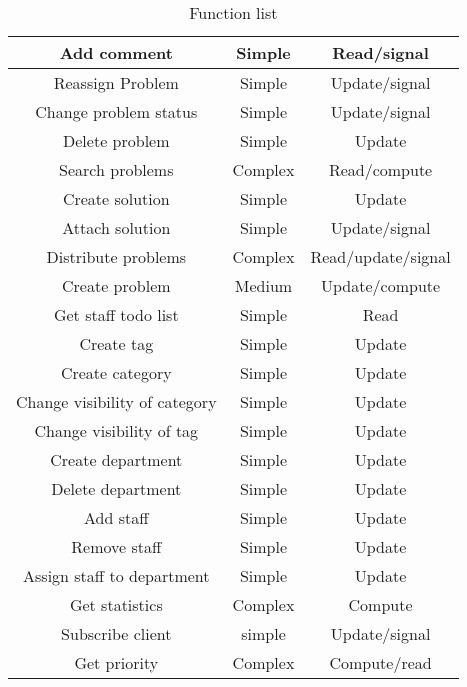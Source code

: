 \begin{table}[h]
\begin{center}
\begin{tabular}{|c|c|c|}
\hline
Add comment &   Simple & Read/signal   \\ \hline%
Reassign Problem & Simple   & Update/signal \\ \hline%
Change problem status &   Simple & Update/signal \\ \hline%
Delete problem & Simple &   Update \\   \hline%
Search problems & Complex &   Read/compute \\ \hline%
Create solution & Simple &   Update \\   \hline%
Attach solution & Simple &   Update/signal \\   \hline%
Distribute problems &   Complex & Read/update/signal \\   \hline%
Create problem & Medium & Update/compute \\   \hline%
Get staff todo list & Simple & Read \\   \hline%
Create tag & Simple &   Update \\ \hline%
Create category & Simple & Update \\ \hline%
Change visibility of category &   Simple &   Update \\   \hline%
Change visibility of tag &   Simple &  Update \\ \hline%
Create department & Simple & Update \\ \hline%
Delete department & Simple & Update \\ \hline%
Add staff & Simple & Update \\ \hline%
Remove staff & Simple & Update \\ \hline%
Assign staff to department & Simple & Update \\ \hline%
Get statistics & Complex & Compute \\ \hline%
Subscribe client & simple & Update/signal \\ \hline%
Get priority & Complex & Compute/read \\ \hline%
\end{tabular}
\end{center}
\caption{Function list}
\label{tab:functionlist}
\end{table}

